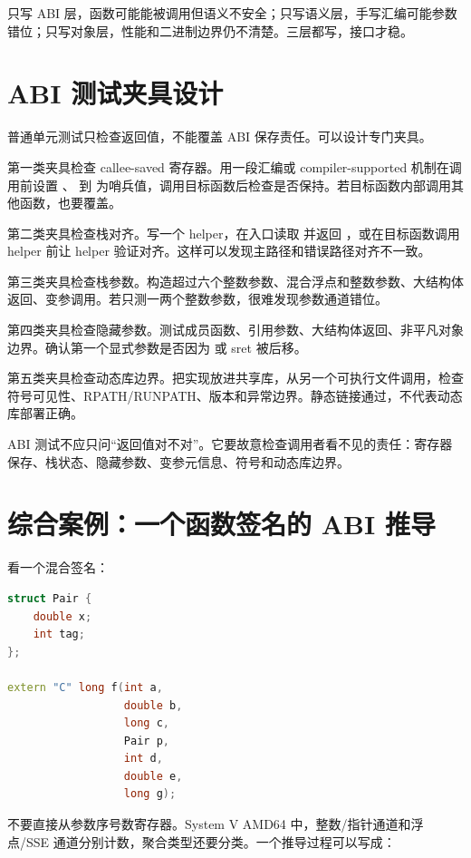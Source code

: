 只写 ABI 层，函数可能能被调用但语义不安全；只写语义层，手写汇编可能参数错位；只写对象层，性能和二进制边界仍不清楚。三层都写，接口才稳。

\section{ABI 测试夹具设计}

普通单元测试只检查返回值，不能覆盖 ABI 保存责任。可以设计专门夹具。

第一类夹具检查 callee-saved 寄存器。用一段汇编或 compiler-supported 机制在调用前设置 、 到  为哨兵值，调用目标函数后检查是否保持。若目标函数内部调用其他函数，也要覆盖。

第二类夹具检查栈对齐。写一个 helper，在入口读取  并返回 ，或在目标函数调用 helper 前让 helper 验证对齐。这样可以发现主路径和错误路径对齐不一致。

第三类夹具检查栈参数。构造超过六个整数参数、混合浮点和整数参数、大结构体返回、变参调用。若只测一两个整数参数，很难发现参数通道错位。

第四类夹具检查隐藏参数。测试成员函数、引用参数、大结构体返回、非平凡对象边界。确认第一个显式参数是否因为  或 sret 被后移。

第五类夹具检查动态库边界。把实现放进共享库，从另一个可执行文件调用，检查符号可见性、RPATH/RUNPATH、版本和异常边界。静态链接通过，不代表动态库部署正确。

\begin{keyidea}
ABI 测试不应只问“返回值对不对”。它要故意检查调用者看不见的责任：寄存器保存、栈状态、隐藏参数、变参元信息、符号和动态库边界。
\end{keyidea}

\section{综合案例：一个函数签名的 ABI 推导}

看一个混合签名：

\begin{lstlisting}[language=C++]
struct Pair {
    double x;
    int tag;
};

extern "C" long f(int a,
                  double b,
                  long c,
                  Pair p,
                  int d,
                  double e,
                  long g);
\end{lstlisting}

不要直接从参数序号数寄存器。System V AMD64 中，整数/指针通道和浮点/SSE 通道分别计数，聚合类型还要分类。一个推导过程可以写成：

